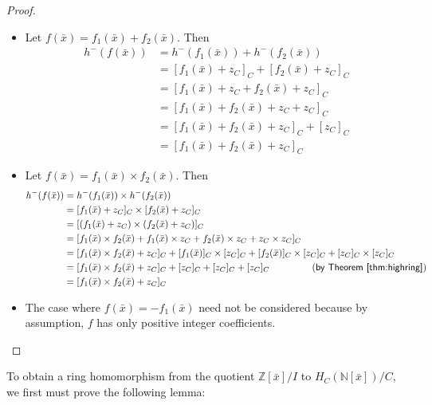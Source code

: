 \documentclass{msthesis}
\theoremstyle{definition}
\newcommand{\ints}{\mathbb{Z}}
\newcommand{\nat}{\mathbb{N}}
\begin{document}
\begin{proof}
    \begin{itemize}[nosep]
        \item Let $f(\bar{x}) = f_1(\bar{x}) + f_2(\bar{x})$.  Then 
        \begin{align*}
            h^-(f(\bar{x})) &= h^-(f_1(\bar{x})) + h^-(f_2(\bar{x})) \\
            &= [f_1(\bar{x}) + z_C]_C + [f_2(\bar{x}) + z_C]_C \\
            &= [f_1(\bar{x}) + z_C + f_2(\bar{x}) + z_C]_C \\
            &= [f_1(\bar{x}) + f_2(\bar{x}) + z_C + z_C]_C \\
            &= [f_1(\bar{x}) + f_2(\bar{x}) + z_C]_C + [z_C]_C \\
            &= [f_1(\bar{x}) + f_2(\bar{x}) + z_C]_C
        \end{align*}
        \item Let $f(\bar{x}) = f_1(\bar{x}) \times f_2(\bar{x})$. Then
        \begin{align*}
            h^-(f(\bar{x})) &= h^-(f_1(\bar{x})) \times h^-(f_2(\bar{x})) \\
            &= [f_1(\bar{x}) + z_C]_C \times [f_2(\bar{x}) + z_C]_C \\
            &= [(f_1(\bar{x}) + z_C) \times (f_2(\bar{x}) + z_C)]_C \\
            &= [f_1(\bar{x})\times f_2(\bar{x}) + f_1(\bar{x})\times z_C + f_2(\bar{x}) \times z_C + z_C \times z_C]_C \\
            &= [f_1(\bar{x})\times f_2(\bar{x}) + z_C]_C + [f_1(\bar{x})]_C \times [z_C]_C + [f_2(\bar{x})]_C \times [z_C]_C + [z_C]_C \times [z_C]_C \\
            &= [f_1(\bar{x})\times f_2(\bar{x}) + z_C]_C + [z_C]_C + [z_C]_C + [z_C]_C \;\;\;\;\;\;\;\;\;\;\;\;\;\;\;\;(\textsf{by Theorem \ref{thm:highring}}) \\
            &= [f_1(\bar{x})\times f_2(\bar{x}) + z_C]_C
        \end{align*}
        \item The case where $f(\bar{x}) = -f_1(\bar{x})$ need not be considered because by assumption, $f$ has only positive integer coefficients.
    \end{itemize}
\end{proof}

To obtain a ring homomorphism from the quotient $\ints[\bar{x}]/I$ to $H_C(\nat[\bar{x}])/C$, we first must prove the following lemma:
\end{document}
